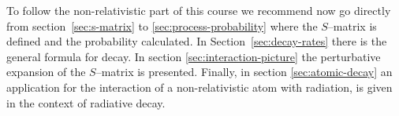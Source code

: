 To follow the non-relativistic part of this course we recommend now go directly from section~\ref{sec:s-matrix} to \ref{sec:process-probability} where the $S$--matrix is defined and the probability calculated. In Section~\ref{sec:decay-rates} there is the general formula for decay. In section \ref{sec:interaction-picture} the perturbative expansion of the $S$--matrix is presented. Finally, in section \ref{sec:atomic-decay} an application for the interaction of a non-relativistic atom with radiation, is given in the context of radiative decay.


